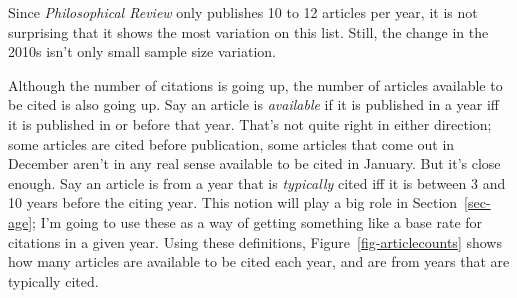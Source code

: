 \documentclass[
  12pt,
  letterpaper,
  DIV=11,
  numbers=noendperiod]{scrartcl}
\begin{document}
Since \emph{Philosophical Review} only publishes 10 to 12 articles per
year, it is not surprising that it shows the most variation on this
list. Still, the change in the 2010s isn't only small sample size
variation.

Although the number of citations is going up, the number of articles
available to be cited is also going up. Say an article is
\emph{available} if it is published in a year iff it is published in or
before that year. That's not quite right in either direction; some
articles are cited before publication, some articles that come out in
December aren't in any real sense available to be cited in January. But
it's close enough. Say an article is from a year that is
\emph{typically} cited iff it is between 3 and 10 years before the
citing year. This notion will play a big role in Section~\ref{sec-age};
I'm going to use these as a way of getting something like a base rate
for citations in a given year. Using these definitions,
Figure~\ref{fig-articlecounts} shows how many articles are available to
be cited each year, and are from years that are typically cited.
\end{document}

